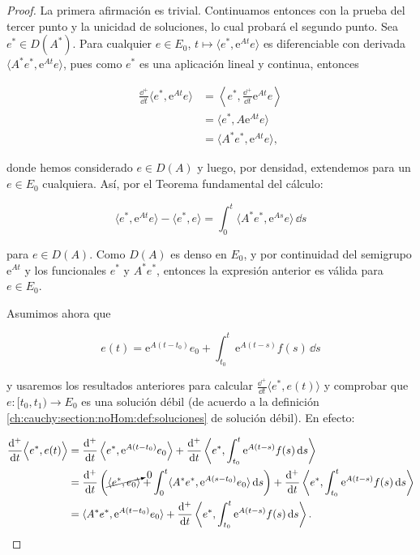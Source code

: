 \begin{proof}
    La primera afirmación es trivial. Continuamos entonces con la prueba del tercer punto y la unicidad de soluciones, lo cual probará el segundo punto. Sea $e^* \in D(A^*)$. Para cualquier $e \in E_0$, $t \mapsto \langle e^*, \mathrm{e}^{At}e \rangle$ es diferenciable con derivada $\langle A^*e^*, \mathrm{e}^{At}e \rangle$, pues como $e^*$ es una aplicación lineal y continua, entonces

    \begin{align*}
        \frac{\dd^+}{\dd t}\langle e^*, \mathrm{e}^{At}e \rangle &= \left \langle e^*, \frac{\dd^+}{\dd t}\mathrm{e}^{At}e \right \rangle\\
        &= \langle e^*, A\mathrm{e}^{At}e \rangle\\
        &= \langle A^* e^*, \mathrm{e}^{At}e \rangle,
    \end{align*}

    donde hemos considerado $e \in D(A)$ y luego, por densidad, extendemos para un $e \in E_0$ cualquiera. Así, por el Teorema fundamental del cálculo:

    \[\langle e^*, \mathrm{e}^{At}e \rangle - \langle e^*, e \rangle = \int_0^t \langle A^* e^*, \mathrm{e}^{As}e \rangle \, \dd s\]

    para $e \in D(A)$. Como $D(A)$ es denso en $E_0$, y por continuidad del semigrupo $\mathrm{e}^{At}$ y los funcionales $e^*$ y $A^*e^*$, entonces la expresión anterior es válida para $e \in E_0$.\footnotemark

    Asumimos ahora que
    
    \[e(t) = \mathrm{e}^{A(t-t_0)}e_0 + \int_{t_0}^{t} \mathrm{e}^{A(t-s)}f(s)\, \dd s\]
    
    y usaremos los resultados anteriores para calcular $\displaystyle\frac{\dd^+}{\dd t}\langle e^*, e(t) \rangle$ y comprobar que $e : [t_0, t_1) \rightarrow E_0$ es una solución débil (de acuerdo a la definición \ref{ch:cauchy:section:noHom:def:soluciones} de solución débil). En efecto:

    \begin{align*}
        \frac{\mathrm{d}^+}{\mathrm{d} t} \Big \langle e^*, e(t) \Big \rangle &= \frac{\mathrm{d}^+}{\mathrm{d} t} \left \langle e^*, \mathrm{e}^{A(t-t_0)}e_0 \right \rangle + \frac{\mathrm{d}^+}{\mathrm{d} t}\left \langle e^*, \int_{t_0}^t \mathrm{e}^{A(t-s)}f(s) \, \mathrm{d} s \right \rangle\\
        &=\frac{\mathrm{d}^+}{\mathrm{d} t} \left( \cancelto{0}{\langle e^*, e_0 \rangle} + \int_0^t \langle A^* e^*, \mathrm{e}^{A(s-t_0)}e_0 \rangle \, \mathrm{d} s \right) + \frac{\mathrm{d}^+}{\mathrm{d} t}\left \langle e^*, \int_{t_0}^t \mathrm{e}^{A(t-s)}f(s) \, \mathrm{d} s \right \rangle\\
        &=\langle A^* e^*, \mathrm{e}^{A(t-t_0)}e_0 \rangle + \frac{\mathrm{d}^+}{\mathrm{d} t}\left \langle e^*, \int_{t_0}^t \mathrm{e}^{A(t-s)}f(s) \, \mathrm{d} s \right \rangle.
    \end{align*}


\end{proof}
